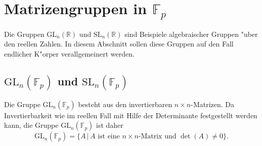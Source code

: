 %
%
%
\section{Matrizengruppen in $\mathbb F_p$}
Die Gruppen $\textrm{GL}_n(\mathbb R)$ und $\textrm{SL}_n(\mathbb R)$
sind Beispiele algebraischer Gruppen "uber den reellen Zahlen.
In diesem Abschnitt sollen diese Gruppen auf den Fall endlicher K"orper
verallgemeinert werden.

\subsection{$\textrm{GL}_n(\mathbb F_p)$ und $\textrm{SL}_n(\mathbb F_p)$}
Die Gruppe $\textrm{GL}_n(\mathbb F_p)$ besteht aus den
invertierbaren $n\times n$-Matrizen.
Da Invertierbarkeit wie im reellen Fall mit Hilfe der Determinante
festgestellt werden kann, die Gruppe $\textrm{GL}_n(\mathbb F_p)$ ist 
daher
\[
\textrm{GL}_n(\mathbb F_p)
=
\{ A\,|\,\text{$A$ ist eine $n\times n$-Matrix und $\det(A)\ne 0$}\}.
\]

